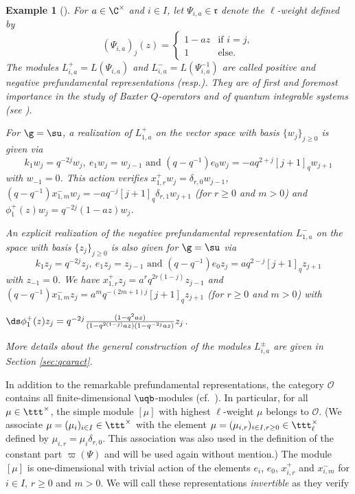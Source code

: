 \documentclass[11pt]{amsart}
\newtheorem{example}[theorem]{Example}
\theoremstyle{definition}
\theoremstyle{remark}
\numberwithin{equation}{section}
\begin{document}
\begin{example}[{\cite[Sections 4 and 5]{hj}}]\label{ex:Lpmsl2} For $a \in \C^{\times}$ and $i\in I$, let $\Psi_{i,a} \in \mathfrak{r}$ denote the $\ell$-weight defined by
$$(\Psi_{i,a})_j(z) = \left\{\begin{array}{ll}
1-az & \text{if } i=j,\\
1 & \text{else.}
\end{array}\right.$$
The modules $L_{i,a}^{+}=L(\Psi_{i,a})$ and $L_{i,a}^- = L(\Psi_{i,a}^{-1})$ are called positive and negative prefundamental representations (resp.). They are of first and foremost importance in the study of Baxter $Q$-operators and of quantum integrable systems (see \cite{fh1}).\par For $\g = \su$, a realization of $L_{1,a}^{+}$ on the vector space with basis $\{w_j\}_{j\geq 0}$ is given via
$$k_1w_j = q^{-2j}w_j,\ e_1w_j = w_{j-1}\text{ and }(q-q^{-1})e_0w_j = -aq^{2+j}[j+1]_qw_{j+1}$$
with $w_{-1}=0$. This action verifies $x_{1,r}^+w_j = \delta_{r,0}w_{j-1}$, $(q-q^{-1})x_{1,m}^-w_j = -aq^{-j}[j+1]_q\delta_{r,1}w_{j+1}$ (for $r \geq 0$ and $m>0$) and $\phi_1^+(z)w_j = q^{-2j}(1-az)w_j$. \par An explicit realization of the negative prefundamental representation $L_{1,a}^{-}$ on the space with basis $\{z_j\}_{j\geq 0}$ is also given for $\g = \su$ via
$$k_1z_j = q^{-2j}z_j,\ e_1z_j = z_{j-1}\text{ and }(q-q^{-1})e_0z_j = aq^{2-j}[j+1]_qz_{j+1}$$
with $z_{-1}=0$. We have $x_{1,r}^+ z_j = a^r q^{2r(1-j)}z_{j-1}$ and $(q- q^{-1})x_{1,m}^-z_j = a^mq^{-(2m+1)j}[j+1]_qz_{j+1}$ (for $r\geq 0$ and $m>0$) with
\begin{center}
$\ds \phi_1^+(z)z_j = q^{-2j}\frac{(1-q^2 a z)}{(1-q^{2(1-j)}a z)(1-q^{-2j}a z)}z_j$.
\end{center} 
More details about the general construction of the modules $L_{i,a}^{\pm}$ are given in Section \ref{sec:qcaract}.
\end{example}
In addition to the remarkable prefundamental representations, the category $\mathcal{O}$ contains all finite-dimensional $\uqb$-modules (cf.~\cite{hj}). In particular, for all $\mu\in \ttt^{\times}$, the simple module $[\mu]$ with highest $\ell$-weight $\mu$ belongs to $\mathcal{O}$. (We associate $\mu = (\mu_i)_{i\in I}\in \ttt^{\times}$ with the element $\mu = (\mu_{i,r})_{i\in I,r\geq 0}\in\ttt_{\ell}^{\times}$ defined by $\mu_{i,r}= \mu_i\delta_{r,0}$. This association was also used in the definition of the constant part $\varpi(\Psi)$ and will be used again without mention.) The module $[\mu]$ is one-dimensional with trivial action of the elements $e_i$, $e_0$, $x_{i,r}^+$ and $x_{i,m}^-$ for $i\in I$, $r\geq 0$ and $m>0$. We will call these representations \textit{invertible} as they verify
\end{document}
